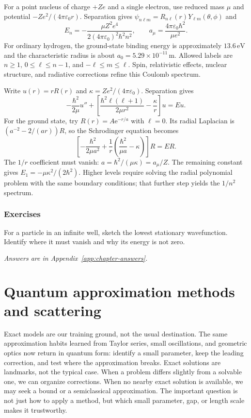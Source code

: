 \documentclass[11pt,oneside]{book}
\newcommand{\ee}{\mathrm{e}}
\newcommand{\eps}{\varepsilon_0}
\theoremstyle{reviewstyle}
\newcommand{\learningcheck}[1]{\subsection*{Exercises}\noindent #1\par\smallskip\noindent\emph{Answers are in Appendix~\ref{app:chapter-answers}.}}
\begin{document}
For a point nucleus of charge $+Ze$ and a single electron, use reduced mass $\mu$ and potential $-Ze^2/(4\pi\eps r)$. Separation gives $\psi_{n\ell m}=R_{n\ell}(r)Y_{\ell m}(\theta,\phi)$ and
\begin{equation}E_n=-\frac{\mu Z^2e^4}{2(4\pi\eps)^2\hbar^2n^2},\qquad a_\mu=\frac{4\pi\eps\hbar^2}{\mu e^2}.\end{equation}
For ordinary hydrogen, the ground-state binding energy is approximately $13.6\,\mathrm{eV}$ and the characteristic radius is about $a_0=5.29\times10^{-11}\,\mathrm m$. Allowed labels are $n\geq1$, $0\leq\ell\leq n-1$, and $-\ell\leq m\leq\ell$. Spin, relativistic effects, nuclear structure, and radiative corrections refine this Coulomb spectrum.

Write $u(r)=rR(r)$ and $\kappa=Ze^2/(4\pi\eps)$. Separation gives
\begin{equation}
-\frac{\hbar^2}{2\mu}u''+
\left[\frac{\hbar^2\ell(\ell+1)}{2\mu r^2}-\frac\kappa r\right]u=Eu.
\end{equation}
For the ground state, try $R(r)=A\ee^{-r/a}$ with $\ell=0$. Its radial Laplacian is $(a^{-2}-2/(ar))R$, so the Schrodinger equation becomes
\begin{equation}
\left[-\frac{\hbar^2}{2\mu a^2}
+\frac1r\left(\frac{\hbar^2}{\mu a}-\kappa\right)\right]R=ER.
\end{equation}
The $1/r$ coefficient must vanish: $a=\hbar^2/(\mu\kappa)=a_\mu/Z$. The remaining constant gives $E_1=-\mu\kappa^2/(2\hbar^2)$. Higher levels require solving the radial polynomial problem with the same boundary conditions; that further step yields the $1/n^2$ spectrum.

\learningcheck{For a particle in an infinite well, sketch the lowest stationary wavefunction. Identify where it must vanish and why its energy is not zero.}

\chapter{Quantum approximation methods and scattering}
Exact models are our training ground, not the usual destination. The same approximation habits learned from Taylor series, small oscillations, and geometric optics now return in quantum form: identify a small parameter, keep the leading correction, and test where the approximation breaks.
Exact solutions are landmarks, not the typical case. When a problem differs slightly from a solvable one, we can organize corrections. When no nearby exact solution is available, we may seek a bound or a semiclassical approximation. The important question is not just how to apply a method, but which small parameter, gap, or length scale makes it trustworthy.
\end{document}
